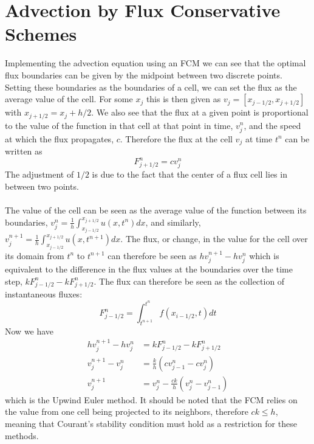 \section{Advection by Flux Conservative Schemes}
Implementing the advection equation using an FCM we can see that the optimal flux boundaries can be given by the midpoint between two discrete points. Setting these boundaries as the boundaries of a cell, we can set the flux as the average value of the cell. For some $x_j$ this is then given as $v_j=[x_{j-1/2},x_{j+1/2}]$ with $x_{j+1/2} = x_j + h/2$. We also see that the flux at a given point is proportional to the value of the function in that cell at that point in time, $v_j^n$, and the speed at which the flux propagates, $c$. Therefore the flux at the cell $v_j$ at time $t^n$ can be written as
\begin{equation}\label{eq:adv_flux}
  F^n_{j+1/2} =cv^n_j
\end{equation}
The adjustment of $1/2$ is due to the fact that the center of a flux cell lies in between two points.
\\
\\
The value of the cell can be seen as the average value of the function between its boundaries, $v^n_j=\frac{1}{h}\int_{x_{j-1/2}}^{x_{j+1/2}}u(x,t^n)dx$, and similarly, $v^{n+1}_j=\frac{1}{h}\int_{x_{j-1/2}}^{x_{j+1/2}}u(x,t^{n+1})dx$. The flux, or change, in the value for the cell over its domain from $t^n$ to $t^{n+1}$ can therefore be seen as $hv^{n+1}_j - hv^n_j$ which is equivalent to the difference in the flux values at the boundaries over the time step, $kF^n_{j-1/2} - kF^n_{j+1/2}$. The flux can therefore be seen as the collection of instantaneous fluxes:
\begin{equation*}
  F^n_{j-1/2} = \int_{t^{n+1}}^{t^n}f(x_{i-1/2},t)dt
\end{equation*}
Now we have
\begin{align}
  hv^{n+1}_j - hv^n_j   &=  kF^n_{j-1/2} - kF^n_{j+1/2}\\
  v^{n+1}_j - v^n_j     &= \frac{k}{h}(cv^n_{j-1} - cv^n_j)\\
  v^{n+1}_j             &= v^n_j - \frac{ck}{h}(v^n_{j} - v^n_{j-1}) \label{eq:flux_upwind}
\end{align}
which is the Upwind Euler method. It should be noted that the FCM relies on the value from one cell being projected to its neighbors, therefore $ck\leq h$, meaning that Courant's stability condition must hold as a restriction for these methods.
